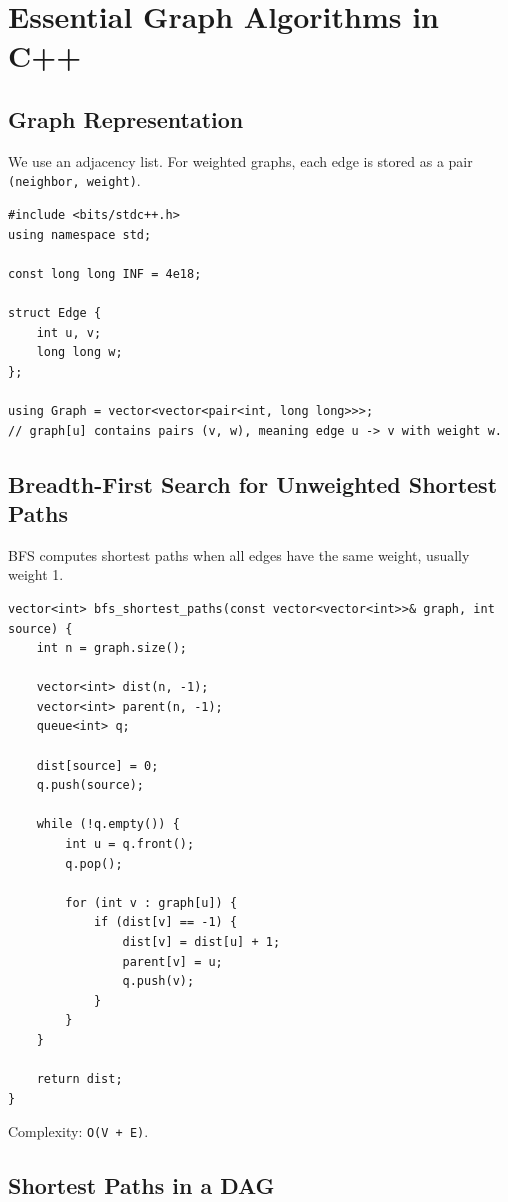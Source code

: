 \documentclass[11pt]{article}
\begin{document}
\section{Essential Graph Algorithms in C++}

\subsection{Graph Representation}

We use an adjacency list. For weighted graphs, each edge is stored as a pair
\texttt{(neighbor, weight)}.

\begin{lstlisting}
#include <bits/stdc++.h>
using namespace std;

const long long INF = 4e18;

struct Edge {
    int u, v;
    long long w;
};

using Graph = vector<vector<pair<int, long long>>>;
// graph[u] contains pairs (v, w), meaning edge u -> v with weight w.
\end{lstlisting}

\subsection{Breadth-First Search for Unweighted Shortest Paths}

BFS computes shortest paths when all edges have the same weight, usually weight 1.

\begin{lstlisting}
vector<int> bfs_shortest_paths(const vector<vector<int>>& graph, int source) {
    int n = graph.size();

    vector<int> dist(n, -1);
    vector<int> parent(n, -1);
    queue<int> q;

    dist[source] = 0;
    q.push(source);

    while (!q.empty()) {
        int u = q.front();
        q.pop();

        for (int v : graph[u]) {
            if (dist[v] == -1) {
                dist[v] = dist[u] + 1;
                parent[v] = u;
                q.push(v);
            }
        }
    }

    return dist;
}
\end{lstlisting}

Complexity: \texttt{O(V + E)}.

\subsection{Shortest Paths in a DAG}
\end{document}
